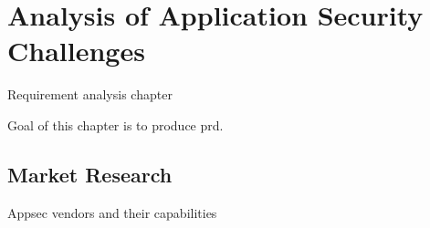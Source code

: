 \chapter{Analysis of Application Security Challenges}
\label{ch:security-challenges}

Requirement analysis chapter

Goal of this chapter is to produce \gls{prd}.

\section{Market Research}

Appsec vendors and their capabilities